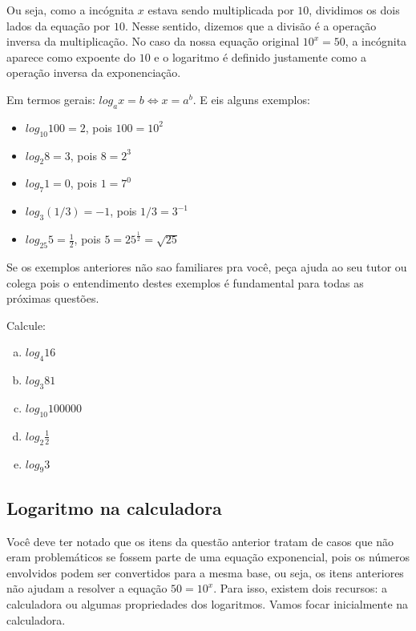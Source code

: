 \documentclass[main_estudante.tex]{subfiles}
\begin{document}
Ou seja, como a incógnita $x$ estava sendo multiplicada por $10$, dividimos os dois lados da equação por $10$. Nesse sentido, dizemos que a divisão é a operação inversa da multiplicação. No caso da nossa equação original $10^x=50$, a incógnita aparece como expoente do $10$ e o logaritmo é definido justamente como a operação inversa da exponenciação.

\begin{caixaExemplo}
Em termos gerais: $log_a x = b \Leftrightarrow x=a^b$. E eis alguns exemplos:

\begin{itemize}
 \item $log_{10} 100 = 2$, pois $100=10^2$
 \item $log_2 8 = 3$, pois $8=2^3$
 \item $log_7 1 = 0$, pois $1=7^0$
 \item $log_3 (1/3) = -1$, pois $1/3=3^{-1}$
 \item $log_{25} 5 = \frac{1}{2}$, pois $5=25^{\frac{1}{2}}=\sqrt{25}$
\end{itemize}
\end{caixaExemplo}

Se os exemplos anteriores não sao familiares pra você, peça ajuda ao seu tutor ou colega pois o entendimento destes exemplos é fundamental para todas as próximas questões.

\begin{questao}
Calcule:
\begin{enumerate}[a)]
\item $log_4 16$
\item $log_3 81$
\item $log_{10} 100000$
\item $log_2 \frac{1}{2}$
\item $log_9 3$
\end{enumerate}
\end{questao}

\subsection*{Logaritmo na calculadora}

Você deve ter notado que os itens da questão anterior tratam de casos que não eram problemáticos se fossem parte de uma equação exponencial, pois os números envolvidos podem ser convertidos para a mesma base, ou seja, os itens anteriores não ajudam a resolver a equação $50=10^x$. Para isso, existem dois recursos: a calculadora ou algumas propriedades dos logaritmos. Vamos focar inicialmente na calculadora.
\end{document}
